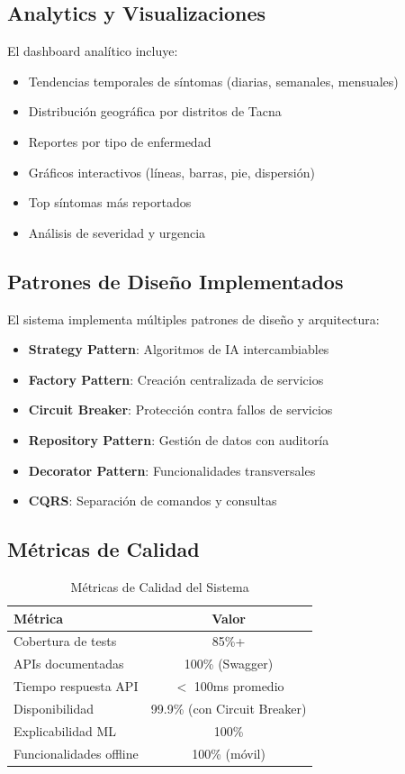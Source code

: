 \documentclass[12pt,a4paper]{article}
\begin{document}
\subsection{Analytics y Visualizaciones}

El dashboard analítico incluye:

\begin{itemize}
    \item Tendencias temporales de síntomas (diarias, semanales, mensuales)
    \item Distribución geográfica por distritos de Tacna
    \item Reportes por tipo de enfermedad
    \item Gráficos interactivos (líneas, barras, pie, dispersión)
    \item Top síntomas más reportados
    \item Análisis de severidad y urgencia
\end{itemize}

\subsection{Patrones de Diseño Implementados}

El sistema implementa múltiples patrones de diseño y arquitectura:

\begin{itemize}
    \item \textbf{Strategy Pattern}: Algoritmos de IA intercambiables
    \item \textbf{Factory Pattern}: Creación centralizada de servicios
    \item \textbf{Circuit Breaker}: Protección contra fallos de servicios
    \item \textbf{Repository Pattern}: Gestión de datos con auditoría
    \item \textbf{Decorator Pattern}: Funcionalidades transversales
    \item \textbf{CQRS}: Separación de comandos y consultas
\end{itemize}

\subsection{Métricas de Calidad}

\begin{table}[H]
\centering
\caption{Métricas de Calidad del Sistema}
\begin{tabular}{|l|c|}
\hline
\textbf{Métrica} & \textbf{Valor} \\
\hline
Cobertura de tests & 85\%+ \\
\hline
APIs documentadas & 100\% (Swagger) \\
\hline
Tiempo respuesta API & $<$ 100ms promedio \\
\hline
Disponibilidad & 99.9\% (con Circuit Breaker) \\
\hline
Explicabilidad ML & 100\% \\
\hline
Funcionalidades offline & 100\% (móvil) \\
\hline
\end{tabular}
\end{table}
\end{document}
